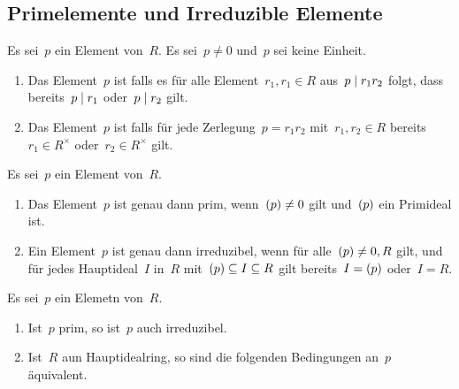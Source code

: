 \subsection{Primelemente und Irreduzible Elemente}

\begin{definition}
  Es sei~$p$ ein Element von~$R$.
  Es sei~$p \neq 0$ und~$p$ sei keine Einheit.
  \begin{enumerate}
    \item
      Das Element~$p$ ist  falls es für alle Element~$r_1, r_1 \in R$ aus~$p \mid r_1 r_2$ folgt, dass bereits~$p \mid r_1$ oder~$p \mid r_2$ gilt.
    \item
      Das Element~$p$ ist  falls für jede Zerlegung~$p = r_1 r_2$ mit~$r_1, r_2 \in R$ bereits~$r_1 \in R^\times$ oder~$r_2 \in R^\times$ gilt.
  \end{enumerate}
\end{definition}


\begin{proposition}
  Es sei~$p$ ein Element von~$R$.
  \begin{enumerate}
    \item
      Das Element~$p$ ist genau dann prim, wenn~$(p) \neq 0$ gilt und~$(p)$ ein Primideal ist.
    \item
      Ein Element~$p$ ist genau dann irreduzibel, wenn für alle~$(p) \neq 0, R$ gilt, und für jedes Hauptideal~$I$ in~$R$ mit~$(p) \subseteq I \subseteq R$ gilt bereits~$I = (p)$ oder~$I = R$.
  \end{enumerate}
\end{proposition}

\begin{proposition}
  Es sei~$p$ ein Elemetn von~$R$.
  \begin{enumerate}
    \item
      Ist~$p$ prim, so ist~$p$ auch irreduzibel.
    \item
      Ist~$R$ aun Hauptidealring, so sind die folgenden Bedingungen an~$p$ äquivalent.
  \end{enumerate}
\end{proposition}



